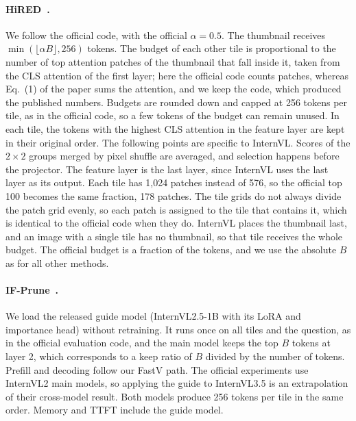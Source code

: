 \paragraph{HiRED~\cite{hired}.}
We follow the official code, with the official $\alpha=0.5$. The thumbnail receives $\min(\lfloor\alpha B\rfloor,256)$
tokens. The budget of each other tile is proportional to the number of top attention patches of the thumbnail that
fall inside it, taken from the CLS attention of the first layer; here the official code counts patches, whereas
Eq.~(1) of the paper sums the attention, and we keep the code, which produced the published numbers. Budgets are
rounded down and capped at 256 tokens per tile, as in the official code, so a few tokens of the budget can remain
unused. In each tile, the tokens with the highest CLS attention in the feature layer are kept in their original order.
The following points are specific to InternVL. Scores of the $2\times2$ groups merged by pixel shuffle are averaged,
and selection happens before the projector. The feature layer is the last layer, since InternVL uses the last layer as
its output. Each tile has 1{,}024 patches instead of 576, so the official top 100 becomes the same fraction, 178
patches. The tile grids do not always divide the patch grid evenly, so each patch is assigned to the tile that
contains it, which is identical to the official code when they do. InternVL places the thumbnail last, and an image with a
single tile has no thumbnail, so that tile receives the whole budget. The official budget is a fraction of the tokens,
and we use the absolute $B$ as for all other methods.

\paragraph{IF-Prune~\cite{ifprune}.}
We load the released guide model (InternVL2.5-1B with its LoRA and importance head) without retraining. It runs once on
all tiles and the question, as in the official evaluation code, and the main model keeps the top $B$ tokens at layer
2, which corresponds to a keep ratio of $B$ divided by the number of tokens. Prefill and decoding follow our FastV
path. The official experiments use InternVL2 main models, so applying the guide to InternVL3.5 is an extrapolation of
their cross-model result. Both models produce 256 tokens per tile in the same order. Memory and TTFT include the guide model.
